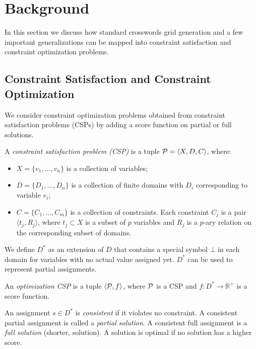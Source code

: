 

\section{Background}
\label{sec::problem}

In this section we discuss how standard crosswords grid generation and a few important generalizations
can be mapped into constraint satisfaction and constraint optimization problems.

\subsection{Constraint Satisfaction and Constraint Optimization}

We consider constraint optimization problems
obtained from
constraint satisfaction problems (CSPs) by adding a score function on partial
or full solutions.

\bdf
A \emph{constraint satisfaction problem (CSP)} is a tuple ${\cal P} = \langle X, D, C \rangle$,
where:
\begin{itemize} 
\item $X = \{v_1, \dots, v_n\}$ is a collection of variables;
\item $D = \{D_1, \dots, D_n\}$ is a collection of finite domains with $D_i$ corresponding to variable $v_i$;
\item $C = \{C_1, \dots, C_m\}$ is a collection of constraints. Each constraint $C_j$ is a pair $\langle t_j, R_j \rangle$, where $t_j \subset X$ is a subset of $p$ variables and $R_j$ is a $p$-ary relation on the corresponding subset of domains.
\end{itemize}
\edf

\noindent We define $D^*$ as an extension of $D$ that contains a special symbol $\bot$ in each domain for variables with no actual value assigned yet. $D^*$ can be used to represent partial assignments.

\bdf
An \emph{optimization CSP} is a tuple $\langle {\cal P}, f \rangle$, 
where ${\cal P}$ is a CSP and 
$f : D^* \rightarrow \mathbb{R}^+$ is a score function.
\edf

An assignment $s \in D^*$ is {\em consistent} if 
it violates no constraint.
A consistent partial assignment is called a {\em partial solution}.
A consistent full assignment is a {\em full solution} (shorter, solution).
A solution is optimal if no solution has a higher score.

